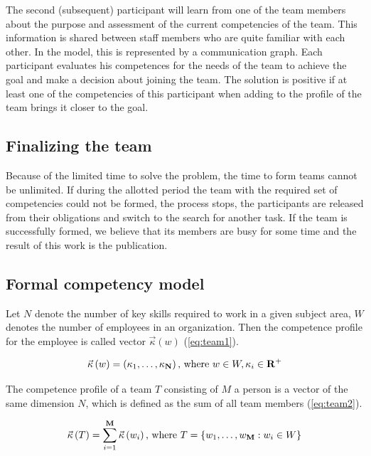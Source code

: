 \documentclass[12pt]{report}
\theoremstyle{definition}
\begin{document}
The second (subsequent) participant will learn from one of the team members about the purpose and assessment of the current competencies of the team. 
This information is shared between staff members who are quite familiar with each other. 
In the model, this is represented by a communication graph. 
Each participant evaluates his competences for the needs of the team to achieve the goal and make a decision about joining the team. 
The solution is positive if at least one of the competencies of this participant when adding to the profile of the team brings it closer to the goal.

\subsection{Finalizing the team}

Because of the limited time to solve the problem, the time to form teams cannot be unlimited.
If during the allotted period the team with the required set of competencies could not be formed, the process stops, the participants are released from their obligations and switch to the search for another task. 
If the team is successfully formed, we believe that its members are busy for some time and the result of this work is the publication.

\subsection{Formal competency model}

Let $N$ denote the number of key skills required to work in a given subject area, $W$ denotes the number of employees in an organization. 
Then the competence profile for the employee is called vector $\vec{\kappa} \left (w \right)$ (\ref{eq:team1}).

\begin{equation}\label{eq:team1}
\vec{\kappa}\left( w \right) = \left( \kappa_1, \ldots, \kappa_{\bf N} \right) \mbox{, where } w \in {W}, \kappa_i \in \mathbf{R}^{+}
\end{equation}

The competence profile of a team $T$ consisting of $M$ a person is a vector of the same dimension $N$, which is defined as the sum of all team members (\ref{eq:team2}).

\begin{equation}\label{eq:team2}
\vec{\kappa} \left( T \right)  = \sum_{i=1}^{{\bf M}}
\vec{\kappa} \left( w_i \right) \mbox{, where } T= \{w_1, \ldots, w_{\bf M} : w_i \in {W} \}
\end{equation}
\end{document}
